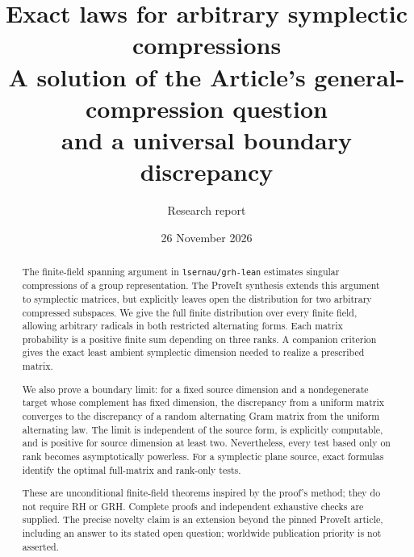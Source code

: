 \documentclass[11pt,a4paper]{article}
\title{\textbf{Exact laws for arbitrary symplectic compressions}\\[4pt]
\large A solution of the Article's general-compression question\\
and a universal boundary discrepancy}
\author{Research report}
\date{26 November 2026}
\numberwithin{equation}{section}
\theoremstyle{remark}
\begin{document}
\maketitle
\begin{abstract}
The finite-field spanning argument in \texttt{lsernau/grh-lean} estimates singular
compressions of a group representation. The ProveIt synthesis extends this
argument to symplectic matrices, but explicitly leaves open the distribution
for two arbitrary compressed subspaces. We give the full finite distribution
over every finite field, allowing arbitrary radicals in both restricted
alternating forms. Each matrix probability is a positive finite sum depending
on three ranks. A companion criterion gives the exact least ambient
symplectic dimension needed to realize a prescribed matrix.

We also prove a boundary limit: for a fixed source dimension and a
nondegenerate target whose complement has fixed dimension, the discrepancy
from a uniform matrix converges to the discrepancy of a random alternating
Gram matrix from the uniform alternating law. The limit is independent of
the source form, is explicitly computable, and is positive for source
dimension at least two. Nevertheless, every test based only on rank becomes
asymptotically powerless. For a symplectic plane source, exact formulas
identify the optimal full-matrix and rank-only tests.

These are unconditional finite-field theorems inspired by the proof's
method; they do not require RH or GRH. Complete proofs and independent
exhaustive checks are supplied. The precise novelty claim is an extension
beyond the pinned ProveIt article, including an answer to its stated open
question; worldwide publication priority is not asserted.
\end{abstract}
\setcounter{tocdepth}{1}
\tableofcontents
\newpage




\end{document}
